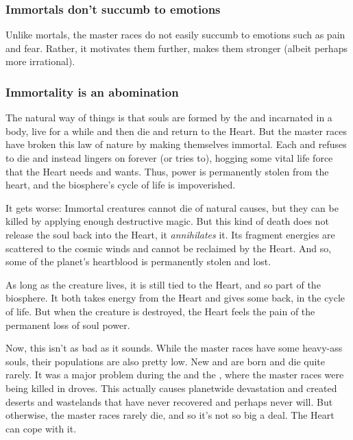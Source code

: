 \subsubsection{Immortals don't succumb to emotions}
Unlike mortals, the master races do not easily succumb to emotions such as pain and fear. 
Rather, it motivates them further, makes them stronger (albeit perhaps more irrational). 





\subsubsection{Immortality is an abomination}
The natural way of things is that souls are formed by the  and incarnated in a body, live for a while and then die and return to the Heart. 
But the master races have broken this law of nature by making themselves immortal. 
Each \dragon{} and \resphan{} refuses to die and instead lingers on forever (or tries to), hogging some vital life force that the Heart needs and wants. 
Thus, power is permanently stolen from the heart, and the biosphere's cycle of life is impoverished. 

It gets worse: 
Immortal creatures cannot die of natural causes, but they can be killed by applying enough destructive magic. 
But this kind of death does not release the soul back into the Heart, it \emph{annihilates} it. 
Its fragment energies are scattered to the cosmic winds and cannot be reclaimed by the Heart. 
And so, some of the planet's heartblood is permanently stolen and lost. 

As long as the creature lives, it is still tied to the Heart, and so part of the biosphere. 
It both takes energy from the Heart and gives some back, in the cycle of life. 
But when the creature is destroyed, the Heart feels the pain of the permanent loss of soul power. 

Now, this isn't as bad as it sounds. 
While the master races have some heavy-ass souls, their populations are also pretty low. 
New \dragons{} and \resphain{} are born and die quite rarely. 
It was a major problem during the \secondbanewar{} and the \resphanwars, where the master races were being killed in droves. 
This actually causes planetwide devastation and created deserts and wastelands that have never recovered and perhaps never will. 
But otherwise, the master races rarely die, and so it's not so big a deal. 
The Heart can cope with it. 

